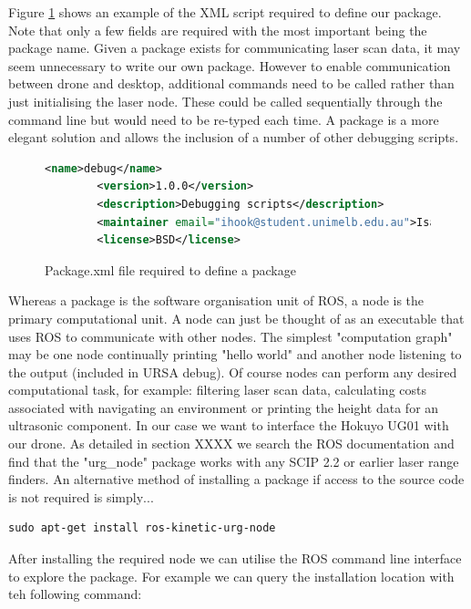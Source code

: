 \documentclass[capstone_report.tex]{subfiles}
\begin{document}
 Figure \ref{fig:package_xml} shows an example of the XML script required to define our package.  Note that only a few fields are required with the most important being the package name. Given a package exists for communicating laser scan data, it may seem unnecessary to write our own package.  However to enable communication between drone and desktop, additional commands need to be called rather than just initialising the laser node.  These could be called sequentially through the command line but would need to be re-typed each time.  A package is a more elegant solution and allows the inclusion of a number of other debugging scripts.

 \begin{figure}[H]
    \begin{lstlisting}[language=xml]
        <name>debug</name>
        <version>1.0.0</version>
        <description>Debugging scripts</description>
        <maintainer email="ihook@student.unimelb.edu.au">Isaac Hook</maintainer>
        <license>BSD</license>
    \end{lstlisting}
    \caption{Package.xml file required to define a package}\label{fig:package_xml}
\end{figure}

Whereas a package is the software organisation unit of ROS, a node is the primary computational unit.  A node can just be thought of as an executable that uses ROS to communicate with other nodes.  The simplest "computation graph" may be one node continually printing "hello world" and another node listening to the output (included in URSA debug).  Of course nodes can perform any desired computational task, for example: filtering laser scan data, calculating costs associated with navigating an environment or printing the height data for an ultrasonic component.  In our case we want to interface the Hokuyo UG01 with our drone.  As detailed in section XXXX we search the ROS documentation and find that the "urg\_node" package works with any SCIP 2.2 or earlier laser range finders.  An alternative method of installing a package if access to the source code is not required is simply$...$

\begin{lstlisting}[language=xml]
    sudo apt-get install ros-kinetic-urg-node
\end{lstlisting}

After installing the required node we can utilise the ROS command line interface to explore the package.  For example we can query the installation location with teh following command:
\end{document}
